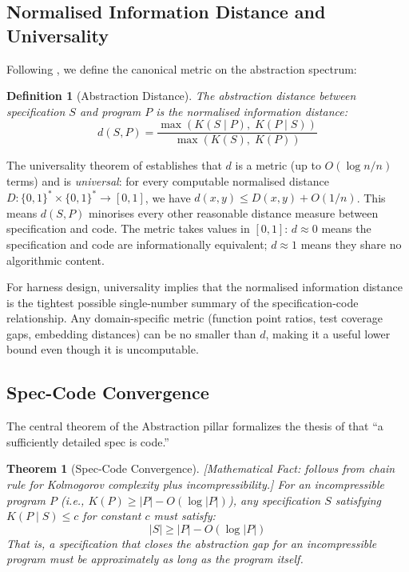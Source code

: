 \documentclass[11pt, a4paper]{googledeepmind}
\newtheorem{definition}{Definition}[section]
\newtheorem{theorem}{Theorem}[section]
\begin{document}
\subsection{Normalised Information Distance and Universality}

Following \citet{li2004similarity}, we define the canonical metric on the abstraction spectrum:

\begin{definition}[Abstraction Distance]
The \emph{abstraction distance} between specification $S$ and program $P$ is the normalised information distance:
\begin{equation}
    d(S, P) = \frac{\max(K(S \mid P),\; K(P \mid S))}{\max(K(S),\; K(P))}
\end{equation}
\end{definition}

The universality theorem of \citet{li2004similarity} establishes that $d$ is a metric (up to $O(\log n / n)$ terms) and is \emph{universal}: for every computable normalised distance $D: \{0,1\}^* \times \{0,1\}^* \to [0,1]$, we have $d(x, y) \leq D(x, y) + O(1/n)$. This means $d(S, P)$ minorises every other reasonable distance measure between specification and code. The metric takes values in $[0, 1]$: $d \approx 0$ means the specification and code are informationally equivalent; $d \approx 1$ means they share no algorithmic content.

For harness design, universality implies that the normalised information distance is the tightest possible single-number summary of the specification-code relationship. Any domain-specific metric (function point ratios, test coverage gaps, embedding distances) can be no smaller than $d$, making it a useful lower bound even though it is uncomputable.

\subsection{Spec-Code Convergence}

The central theorem of the Abstraction pillar formalizes the thesis of \citet{gonzalez2026spec} that ``a sufficiently detailed spec is code.''

\begin{theorem}[Spec-Code Convergence]
\emph{[Mathematical Fact: follows from chain rule for Kolmogorov complexity plus incompressibility.]}
\label{thm:convergence}
For an incompressible program $P$ (i.e., $K(P) \geq |P| - O(\log |P|)$), any specification $S$ satisfying $K(P \mid S) \leq c$ for constant $c$ must satisfy:
\begin{equation}
    |S| \geq |P| - O(\log |P|)
\end{equation}
That is, a specification that closes the abstraction gap for an incompressible program must be approximately as long as the program itself.
\end{theorem}
\end{document}
